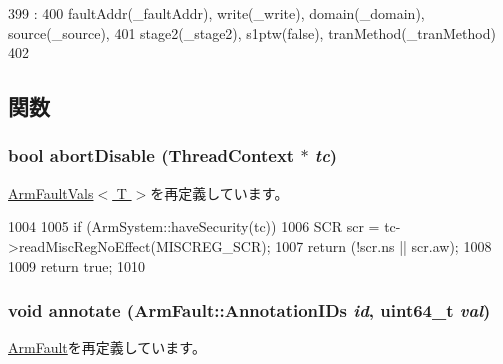 \begin{DoxyCode}
399                                                                                  
        :
400         faultAddr(_faultAddr), write(_write), domain(_domain), source(_source),
401         stage2(_stage2), s1ptw(false), tranMethod(_tranMethod)
402     {}

\end{DoxyCode}


\subsection{関数}
\hypertarget{classArmISA_1_1AbortFault_a92a741baab278ed029d84b0fe979e1b8}{
\subsubsection[{abortDisable}]{\setlength{\rightskip}{0pt plus 5cm}bool abortDisable ({\bf ThreadContext} $\ast$ {\em tc})}}
\label{classArmISA_1_1AbortFault_a92a741baab278ed029d84b0fe979e1b8}


\hyperlink{classArmISA_1_1ArmFaultVals_a1f1a5b662b9a505415dd5ef1f52892f3}{ArmFaultVals$<$ T $>$}を再定義しています。


\begin{DoxyCode}
1004 {
1005     if (ArmSystem::haveSecurity(tc)) {
1006         SCR scr = tc->readMiscRegNoEffect(MISCREG_SCR);
1007         return (!scr.ns || scr.aw);
1008     }
1009     return true;
1010 }
\end{DoxyCode}
\hypertarget{classArmISA_1_1AbortFault_a1534ab135f3f8a49ad6274389bf77b51}{
\subsubsection[{annotate}]{\setlength{\rightskip}{0pt plus 5cm}void annotate ({\bf ArmFault::AnnotationIDs} {\em id}, \/  uint64\_\-t {\em val})}}
\label{classArmISA_1_1AbortFault_a1534ab135f3f8a49ad6274389bf77b51}


\hyperlink{classArmISA_1_1ArmFault_a1711e0fd9d5fa3eaa8e62cc821ef850d}{ArmFault}を再定義しています。

